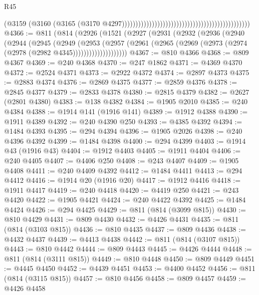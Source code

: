 \begin{lexlean}{R45}
\begin{coremodule}
{                                                                                          (@3159
                                                                                            (@3160
                                                                                              (@3165
                                                                                                (@3170
                                                                                                  @4297)))))))))))))))))))))))))))))))))))))))))))))))
@4366 := @811
    (@814
      (@2926
        (@1521
          (@2927
            (@2931
              (@2932
                (@2936
                  (@2940
                    (@2944
                      (@2945
                        (@2949
                          (@2953
                            (@2957
                              (@2961
                                (@2965 (@2969 (@2973 (@2974 (@2978 (@2982 @4345))))))))))))))))))))
@4367 := @810 @4366
@4368 := @809 @4367
@4369 := @240 @4368
@4370 := @247 @1862
@4371 := @4369 @4370
@4372 := @2524 @4371
@4373 := @2922 @4372
@4374 := @2897 @4373
@4375 := @2883 @4374
@4376 := @2869 @4375
@4377 := @2859 @4376
@4378 := @2845 @4377
@4379 := @2833 @4378
@4380 := @2815 @4379
@4382 := @2627 (@2801 @4380)
@4383 := @138 @4382
@4384 := @1905 @2010
@4385 := @240 @4384
@4388 := @1914 @141 (@1916 @141)
@4389 := @1912 @4388
@4390 := @1911 @4389
@4392 := @240 @4390 @250
@4393 := @4385 @4392
@4394 := @1484 @4393
@4395 := @294 @4394
@4396 := @1905 @2026
@4398 := @240 @4396 @4392
@4399 := @1484 @4398
@4400 := @294 @4399
@4403 := @1914 @43 (@1916 @43)
@4404 := @1912 @4403
@4405 := @1911 @4404
@4406 := @240 @4405
@4407 := @4406 @250
@4408 := @243 @4407
@4409 := @1905 @4408
@4411 := @240 @4409 @4392
@4412 := @1484 @4411
@4413 := @294 @4412
@4416 := @1914 @20 (@1916 @20)
@4417 := @1912 @4416
@4418 := @1911 @4417
@4419 := @240 @4418
@4420 := @4419 @250
@4421 := @243 @4420
@4422 := @1905 @4421
@4424 := @240 @4422 @4392
@4425 := @1484 @4424
@4426 := @294 @4425
@4429 := @811 (@814 (@3099 @815))
@4430 := @810 @4429
@4431 := @809 @4430
@4432 := @4426 @4431
@4435 := @811 (@814 (@3103 @815))
@4436 := @810 @4435
@4437 := @809 @4436
@4438 := @4432 @4437
@4439 := @4413 @4438
@4442 := @811 (@814 (@3107 @815))
@4443 := @810 @4442
@4444 := @809 @4443
@4445 := @4426 @4444
@4448 := @811 (@814 (@3111 @815))
@4449 := @810 @4448
@4450 := @809 @4449
@4451 := @4445 @4450
@4452 := @4439 @4451
@4453 := @4400 @4452
@4456 := @811 (@814 (@3115 @815))
@4457 := @810 @4456
@4458 := @809 @4457
@4459 := @4426 @4458
}
\end{coremodule}
\end{lexlean}
